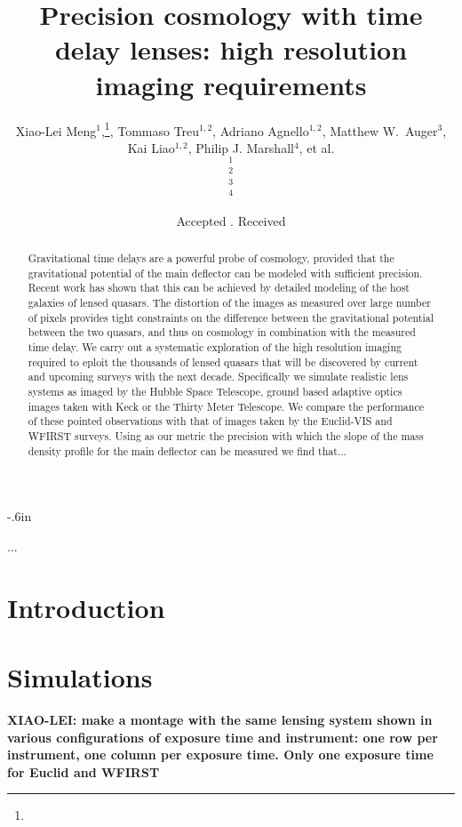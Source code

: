 \documentclass[useAMS,usenatbib]{mn2e}
\title[Imaging time delay lenses]{Precision cosmology with time delay lenses: high resolution imaging requirements}
\author[Meng et al.]{
  Xiao-Lei Meng$^{1}$,\thanks{\xlmemail},
  Tommaso Treu$^{1,2}$,
  Adriano Agnello$^{1,2}$,
\newauthor
  Matthew W.~Auger$^{3}$,
  Kai Liao$^{1,2}$,
  Philip J. Marshall$^{4}$,
  et al.
  \medskip\\
  $^1$\ucsb\\
  $^2$\ucla\\
  $^3$\ioa\\
  $^4$\kipac\\
}
\begin{document}
\voffset-.6in

\date{Accepted . Received }

\pagerange{\pageref{firstpage}--\pageref{lastpage}} 

\maketitle

\label{firstpage}

\begin{abstract}
Gravitational time delays are a powerful probe of cosmology, provided
that the gravitational potential of the main deflector can be modeled
with sufficient precision. Recent work has shown that this can be
achieved by detailed modeling of the host galaxies of lensed
quasars. The distortion of the images as measured over large number of
pixels provides tight constraints on the difference between the
gravitational potential between the two quasars, and thus on cosmology
in combination with the measured time delay. We carry out a systematic
exploration of the high resolution imaging required to eploit the
thousands of lensed quasars that will be discovered by current and
upcoming surveys with the next decade. Specifically we simulate
realistic lens systems as imaged by the Hubble Space Telescope, ground
based adaptive optics images taken with Keck or the Thirty Meter
Telescope. We compare the performance of these pointed observations
with that of images taken by the Euclid-VIS and WFIRST surveys. Using
as our metric the precision with which the slope of the mass density
profile for the main deflector can be measured we find that...
\end{abstract}
\begin{keywords}
...
\end{keywords}

\section{Introduction}

\section{Simulations}

{\bf XIAO-LEI: make a montage with the same lensing system shown in various configurations of exposure time and instrument: one row per instrument, one column per exposure time. Only one exposure time for Euclid and WFIRST}
\end{document}

